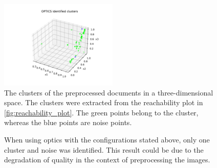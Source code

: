 \begin{figure}[htp] %
    \centering
    \includegraphics[width=0.5\textwidth]{images/OPTICS_cluster.pdf}
    \caption{The clusters of the preprocessed documents in a three-dimensional space.
    The clusters were extracted from the reachability plot in \autoref{fig:reachability_plot}.
    The green points belong to the cluster, whereas the blue points are noise points.
    }
    \label{fig:optics_cluster}
\end{figure}

\begin{figure}%
    \centering
    \qquad
    \caption{When using \ac{optics} with the configurations stated above, only one cluster and noise was identified.
    This result could be due to the degradation of quality in the context of preprocessing the images.}%
    \label{fig:example-cluster}%
\end{figure}